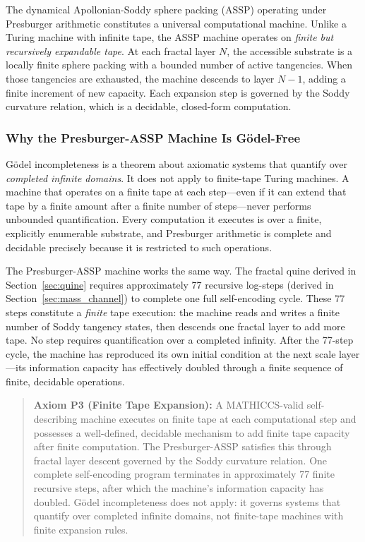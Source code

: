 \documentclass[11pt,a4paper]{article}
\begin{document}
The dynamical Apollonian-Soddy sphere packing (ASSP) operating under Presburger arithmetic constitutes a universal computational machine. Unlike a Turing machine with infinite tape, the ASSP machine operates on \emph{finite but recursively expandable tape}. At each fractal layer $N$, the accessible substrate is a locally finite sphere packing with a bounded number of active tangencies. When those tangencies are exhausted, the machine descends to layer $N-1$, adding a finite increment of new capacity. Each expansion step is governed by the Soddy curvature relation, which is a decidable, closed-form computation.

\subsubsection{Why the Presburger-ASSP Machine Is Gödel-Free}
\label{sec:godel_free}

Gödel incompleteness is a theorem about axiomatic systems that quantify over \emph{completed infinite domains}. It does not apply to finite-tape Turing machines. A machine that operates on a finite tape at each step---even if it can extend that tape by a finite amount after a finite number of steps---never performs unbounded quantification. Every computation it executes is over a finite, explicitly enumerable substrate, and Presburger arithmetic is complete and decidable precisely because it is restricted to such operations.

The Presburger-ASSP machine works the same way. The fractal quine derived in Section~\ref{sec:quine} requires approximately 77 recursive log-steps (derived in Section~\ref{sec:mass_channel}) to complete one full self-encoding cycle. These 77 steps constitute a \emph{finite} tape execution: the machine reads and writes a finite number of Soddy tangency states, then descends one fractal layer to add more tape. No step requires quantification over a completed infinity. After the 77-step cycle, the machine has reproduced its own initial condition at the next scale layer---its information capacity has effectively doubled through a finite sequence of finite, decidable operations.

\begin{quote}
\textbf{Axiom P3 (Finite Tape Expansion):} A MATHICCS-valid self-describing machine executes on finite tape at each computational step and possesses a well-defined, decidable mechanism to add finite tape capacity after finite computation. The Presburger-ASSP satisfies this through fractal layer descent governed by the Soddy curvature relation. One complete self-encoding program terminates in approximately 77 finite recursive steps, after which the machine's information capacity has doubled. Gödel incompleteness does not apply: it governs systems that quantify over completed infinite domains, not finite-tape machines with finite expansion rules.
\end{quote}
\end{document}

